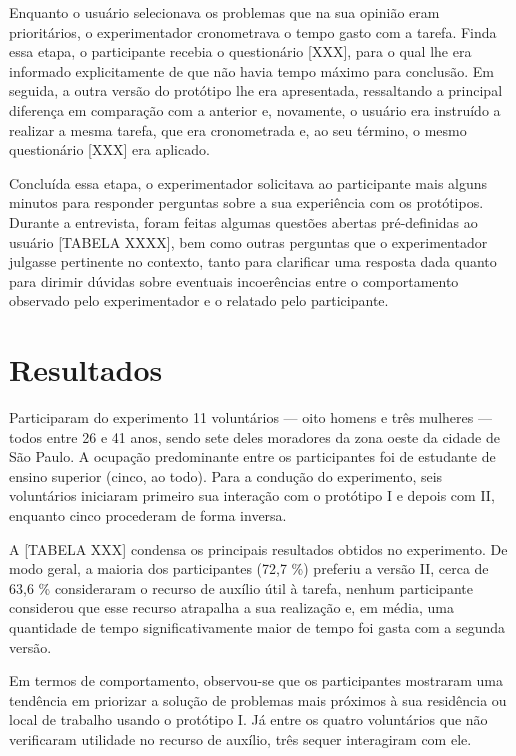 \documentclass{sigchi}
\begin{document}
Enquanto o usuário selecionava os problemas que na sua opinião eram prioritários, o experimentador cronometrava o tempo gasto com a tarefa. Finda essa etapa, o participante recebia o questionário [XXX], para o qual lhe era informado explicitamente de que não havia tempo máximo para conclusão. Em seguida, a outra versão do protótipo lhe era apresentada, ressaltando a principal diferença em comparação com a anterior e, novamente, o usuário era instruído a realizar a mesma tarefa, que era cronometrada e, ao seu término, o mesmo questionário [XXX] era aplicado.

Concluída essa etapa, o experimentador solicitava ao participante mais alguns minutos para responder perguntas sobre a sua experiência com os protótipos. Durante a entrevista, foram feitas algumas questões abertas pré-definidas ao usuário [TABELA XXXX], bem como outras perguntas que o experimentador julgasse pertinente no contexto, tanto para clarificar uma resposta dada quanto para dirimir dúvidas sobre eventuais incoerências entre o comportamento observado pelo experimentador e o relatado pelo participante.



\section{Resultados}
Participaram do experimento 11 voluntários --- oito homens e três mulheres --- todos entre 26 e 41 anos, sendo sete deles moradores da zona oeste da cidade de São Paulo. A ocupação predominante entre os participantes foi de estudante de ensino superior (cinco, ao todo). Para a condução do experimento, seis voluntários iniciaram primeiro sua interação com o protótipo I e depois com II, enquanto cinco procederam de forma inversa.

A [TABELA XXX] condensa os principais resultados obtidos no experimento. De modo geral, a maioria dos participantes (72,7 \%) preferiu a versão II, cerca de 63,6 \% consideraram o recurso de auxílio útil à tarefa, nenhum participante considerou que esse recurso atrapalha a sua realização e, em média, uma quantidade de tempo significativamente maior de tempo foi gasta com a segunda versão.

Em termos de comportamento, observou-se que os participantes mostraram uma tendência em priorizar a solução de problemas mais próximos à sua residência ou local de trabalho usando o protótipo I. Já entre os quatro voluntários que não verificaram utilidade no recurso de auxílio, três sequer interagiram com ele.
\end{document}
